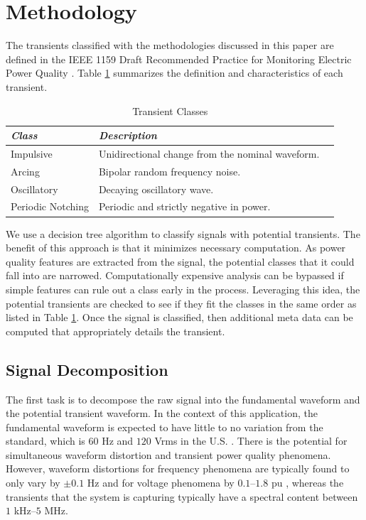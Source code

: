 \documentclass[10pt, conference, compsocconf]{IEEEtran}
\begin{document}
\section{Methodology}
\label{sec:Methodology}
The transients classified with the methodologies discussed in this paper are  defined in the IEEE 1159 Draft Recommended Practice for Monitoring Electric Power Quality \cite{IEEE:2018:1159D3}. Table \ref{TransientClasses} summarizes the definition and characteristics of each transient.

%
\begin{table}[htbp]
\caption{Transient Classes}\label{TransientClasses}
\centering%
\begin{tabular}{lll}
\hline
\textit{Class} & \textit{Description} \\
\hline
Impulsive & Unidirectional change from the nominal waveform. \\
Arcing & Bipolar random frequency noise. \\
Oscillatory & Decaying oscillatory wave. \\
Periodic Notching & Periodic and strictly negative in power. \\
\hline
\end{tabular}
\end{table}
%

We use a decision tree algorithm to classify signals with potential transients. The benefit of this approach is that it minimizes necessary computation. As power quality features are extracted from the signal, the potential classes that it could fall into are narrowed. Computationally expensive analysis can be bypassed if simple features can rule out a class early in the process. Leveraging this idea, the potential transients are checked to see if they fit the classes in the same order as listed in Table \ref{TransientClasses}. Once the signal is classified, then additional meta data can be computed that appropriately details the transient.

\subsection{Signal Decomposition}

The first task is to decompose the raw signal into the fundamental waveform and the potential transient waveform. In the context of this application, the fundamental waveform is expected to have little to no variation from the standard, which is $60$ Hz and $120$ Vrms in the U.S. \cite{ANSI:2016:C84.1-2016}. There is the potential for simultaneous waveform distortion and transient power quality phenomena. However, waveform distortions for frequency phenomena are typically found to only vary by $\pm 0.1$ Hz and for voltage phenomena by $0.1$–$1.8$ pu \cite{IEEE:2018:1159D3}, whereas the transients that the system is capturing typically have a spectral content between $1$ kHz–$5$ MHz.
\end{document}
